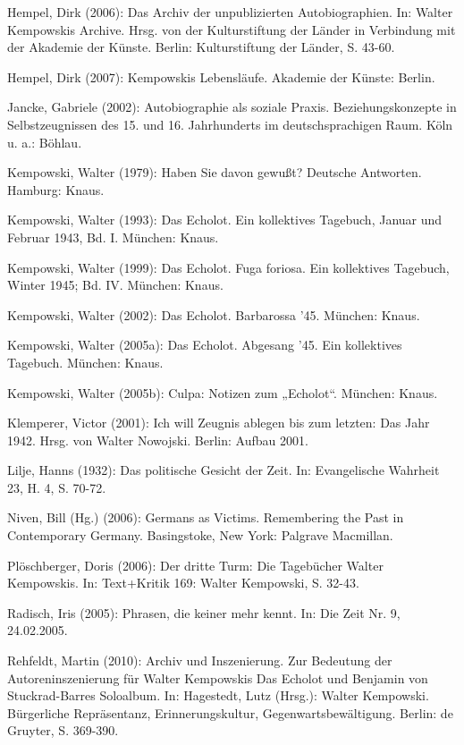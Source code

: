 \begin{multicols*}{2}
\begin{bibdescription}
        \item Hempel, Dirk (2006): Das Archiv der unpublizierten Autobiographien. In: Walter Kempowskis Archive. Hrsg. von der Kulturstiftung der Länder in Verbindung mit der Akademie der Künste. Berlin: Kulturstiftung der Länder, S. 43-60.
        \item Hempel, Dirk (2007): Kempowskis Lebensläufe. Akademie der Künste: Berlin.
        \item Jancke, Gabriele (2002): Autobiographie als soziale Praxis. Beziehungskonzepte in Selbstzeugnissen des 15. und 16. Jahrhunderts im deutschsprachigen Raum. Köln u. a.: Böhlau.
        \item Kempowski, Walter (1979): Haben Sie davon gewußt? Deutsche Antworten. Hamburg: Knaus.
        \item Kempowski, Walter (1993): Das Echolot. Ein kollektives Tagebuch, Januar und Februar 1943, Bd. I. München: Knaus.
        \item Kempowski, Walter (1999): Das Echolot. Fuga foriosa. Ein kollektives Tagebuch, Winter 1945; Bd. IV. München: Knaus.
        \item Kempowski, Walter (2002): Das Echolot. Barbarossa ’45. München: Knaus.
        \item Kempowski, Walter (2005a): Das Echolot. Abgesang ’45. Ein kollektives Tagebuch. München: Knaus.
        \item Kempowski, Walter (2005b): Culpa: Notizen zum „Echolot“. München: Knaus.
        \item Klemperer, Victor (2001): Ich will Zeugnis ablegen bis zum letzten: Das Jahr 1942. Hrsg. von Walter Nowojski. Berlin: Aufbau 2001.
        \item Lilje, Hanns (1932): Das politische Gesicht der Zeit. In: Evangelische Wahrheit 23, H. 4, S. 70-72.
        \item Niven, Bill (Hg.) (2006): Germans as Victims. Remembering the Past in Contemporary Germany. Basingstoke, New York: Palgrave Macmillan.
        \item Plöschberger, Doris (2006): Der dritte Turm: Die Tagebücher Walter Kempowskis. In: Text+Kritik 169: Walter Kempowski, S. 32-43.
        \item Radisch, Iris (2005): Phrasen, die keiner mehr kennt. In: Die Zeit Nr. 9, 24.02.2005.
        \item Rehfeldt, Martin (2010): Archiv und Inszenierung. Zur Bedeutung der Autoreninszenierung für Walter Kempowskis Das Echolot und Benjamin von Stuckrad-Barres Soloalbum. In: Hagestedt, Lutz (Hrsg.): Walter Kempowski. Bürgerliche Repräsentanz, Erinnerungskultur, Gegenwartsbewältigung. Berlin: de Gruyter, S. 369-390.

\end{bibdescription}
\end{multicols*}
